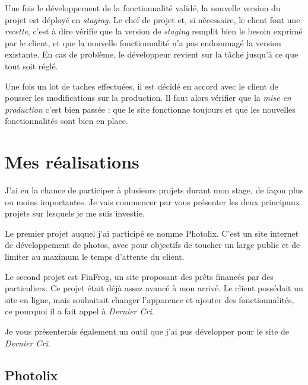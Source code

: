 \bigskip

Une fois le développement de la fonctionnalité validé, la nouvelle
version du projet est déployé en \emph{staging}. Le chef de projet et,
si nécessaire, le client font une \emph{recette}, c'est à dire vérifie
que la version de \emph{staging} remplit bien le besoin exprimé par le
client, et que la nouvelle fonctionnalité n'a pas endommagé la version
existante. En cas de problème, le développeur revient sur la tâche
jusqu'à ce que tout soit réglé.

\bigskip

Une fois un lot de taches effectuées, il est décidé en accord avec le
client de pousser les modifications sur la production. Il faut alors
vérifier que la \emph{mise en production} c'est bien passée : que le
site fonctionne toujours et que les nouvelles fonctionnalités sont bien
en place.

\newpage

\section{Mes réalisations}\label{mes-ruxe9alisations}

\bigskip

J'ai eu la chance de participer à plusieurs projets durant mon stage, de
façon plus ou moins importantes. Je vais commencer par vous présenter
les deux principaux projets sur lesquels je me suis investie.

\bigskip

Le premier projet auquel j'ai participé se nomme Photolix. C'est un site
internet de développement de photos, avec pour objectifs de toucher un
large public et de limiter au maximum le temps d'attente du client.

\bigskip

Le second projet est FinFrog, un site proposant des prêts financés par
des particuliers. Ce projet était déjà assez avancé à mon arrivé. Le
client possédait un site en ligne, mais souhaitait changer l'apparence
et ajouter des fonctionnalités, ce pourquoi il a fait appel à
\emph{Dernier Cri}.

\bigskip

Je vous présenterais également un outil que j'ai pus développer pour le
site de \emph{Dernier Cri}.

\bigskip

\subsection{Photolix}\label{photolix}

